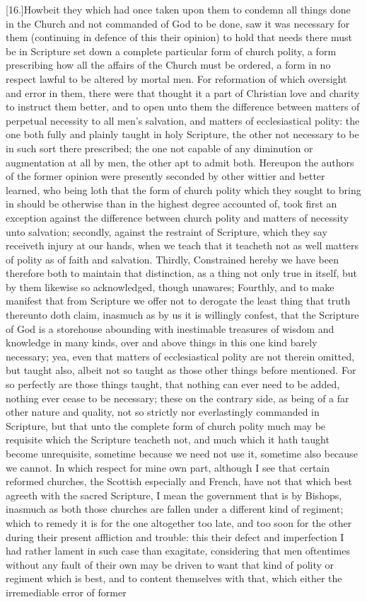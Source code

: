 [16.]Howbeit they which had once taken upon them to  condemn all things done in the Church and not commanded of God to be done, saw it was necessary for them (continuing in defence of this their opinion) to hold that needs there must be in Scripture set down a complete particular form of church polity, a form prescribing how all the affairs of the Church must be ordered, a form in no respect lawful to be altered by mortal men. For reformation of which oversight and error in them, there were that thought it a part of Christian love and charity to instruct them better, and to open unto them the difference between matters of perpetual necessity to all men’s salvation, and matters of ecclesiastical polity: the one both fully and plainly taught in holy Scripture, the other not necessary to be in such sort there prescribed; the one not capable of any diminution or augmentation at all by men, the other apt to admit both. Hereupon the authors of the former opinion were presently seconded by other wittier and better learned, who being loth that the form of church polity which they sought to bring in should be otherwise than in the highest degree accounted of, took first an exception against the difference between church polity and matters of necessity unto salvation; secondly, against the restraint of Scripture, which they say receiveth injury at our hands, when we teach that it teacheth not as well matters of polity as of faith and salvation. Thirdly, Constrained hereby we have been therefore both to maintain that distinction, as a thing not only true in itself, but by them likewise so acknowledged, though unawares; Fourthly, and to make manifest that from Scripture we offer not to derogate the least thing that truth thereunto doth claim, inasmuch as by us it is willingly confest, that the Scripture of God is a storehouse abounding with inestimable  treasures of wisdom and knowledge in many kinds, over and above things in this one kind barely necessary; yea, even that matters of ecclesiastical polity are not therein omitted, but taught also, albeit not so taught as those other things before mentioned. For so perfectly are those things taught, that nothing can ever need to be added, nothing ever cease to be necessary; these on the contrary side, as being of a far other nature and quality, not so strictly nor everlastingly commanded in Scripture, but that unto the complete form of church polity much may be requisite which the Scripture teacheth not, and much which it hath taught become unrequisite, sometime because we need not use it, sometime also because we cannot. In which respect for mine own part, although I see that certain reformed churches, the Scottish especially and French, have not that which best agreeth with the sacred Scripture, I mean the government that is by Bishops, inasmuch as both those churches are fallen under a different kind of regiment; which to remedy it is for the one altogether too late, and too soon for the other during their present affliction and trouble: this their defect and imperfection I had rather lament in such case than exagitate, considering that men oftentimes without any fault of their own may be driven to want that kind of polity or regiment which is best, and to content themselves with that, which either the irremediable error of former 